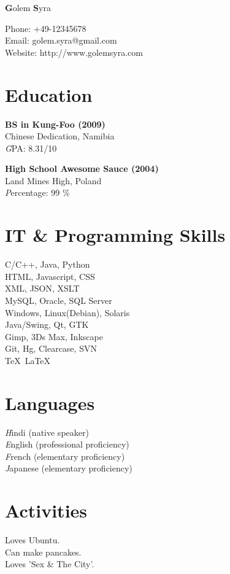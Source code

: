 \documentclass{article}
\begin{document}
\thispagestyle{empty}
\begin{minipage}[c]{0.40\textwidth}
{\bfseries\Huge G}{\Huge olem}
{\bfseries\Huge S}{\Huge yra}

\hfill
\par
Phone: +49-12345678\\
Email: golem.syra@gmail.com\\
Website: http://www.golemsyra.com

\section*{{\color{green} Education}}
\begin{description}
\item
\par
{\bfseries BS in Kung-Foo (2009)}\\
Chinese Dedication, Namibia\\
{\emph GPA: 8.31/10}

\item
\par
{\bfseries High School Awesome Sauce (2004)}\\
Land Mines High, Poland\\
{\emph Percentage: 99 \%}

\end{description}

\section*{{\color{green} IT \& Programming Skills}}

C/C++, Java, Python\\
HTML, Javascript, CSS\\
XML, JSON, XSLT\\
MySQL, Oracle, SQL Server\\
Windows, Linux(Debian), Solaris\\
Java/Swing, Qt, GTK\\
Gimp, 3Ds Max, Inkscape\\
Git, Hg, Clearcase, SVN\\
\TeX\ \LaTeX\

\section*{{\color{green} Languages}}

{\emph Hindi} (native speaker)\\
{\emph English} (professional proficiency)\\
{\emph French} (elementary proficiency)\\
{\emph Japanese} (elementary proficiency)

\section*{{\color{green} Activities}}

Loves Ubuntu.\\
Can make pancakes.\\
Loves 'Sex \& The City'.\\

\end{minipage}
\end{document}
